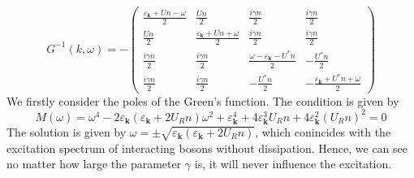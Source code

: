 \documentclass{article}
\newcommand{\tmmathbf}[1]{\ensuremath{\boldsymbol{#1}}}
\begin{document}
\begin{equation}
  G^{- 1} (k, \omega) = - \left(\begin{array}{cccc}
    \frac{\varepsilon_{\tmmathbf{k}} + U n - \omega}{2} & \frac{U n}{2} &
    \frac{i \gamma n}{2} & \frac{i \gamma n}{2}\\
    \frac{U n}{2} & \frac{\varepsilon_{\tmmathbf{k}} + U n + \omega}{2} &
    \frac{i \gamma n}{2} & \frac{i \gamma n}{2}\\
    \frac{i \gamma n}{2} & \frac{i \gamma n}{2} & \frac{\omega -
    \varepsilon_{\tmmathbf{k}} - U^{\ast} n}{2} & - \frac{U^{\ast} n}{2}\\
    \frac{i \gamma n}{2} & \frac{i \gamma n}{2} & - \frac{U^{\ast} n}{2} & -
    \frac{\varepsilon_{\tmmathbf{k}} + U^{\ast} n + \omega}{2}
  \end{array}\right)
\end{equation}
We firstly consider the poles of the Green's function. The condition is given
by
\begin{equation}
  M (\omega) = \omega^4 - 2 \varepsilon_{\tmmathbf{k}}
  (\varepsilon_{\tmmathbf{k}} + 2 U_R n) \omega^2 +
  \varepsilon_{\tmmathbf{k}}^4 + 4 \varepsilon_{\tmmathbf{k}}^3 U_R n + 4
  \varepsilon_{\tmmathbf{k}}^2 (U_R n)^2 = 0
\end{equation}
The solution is given by $\omega = \pm \sqrt{\varepsilon_{\tmmathbf{k}}
(\varepsilon_{\tmmathbf{k}} + 2 U_R n)}$, which conincides with the excitation
spectrum of interacting bosons without dissipation. Hence, we can see no
matter how large the parameter $\gamma$ is, it will never influence the
excitation.
\end{document}
